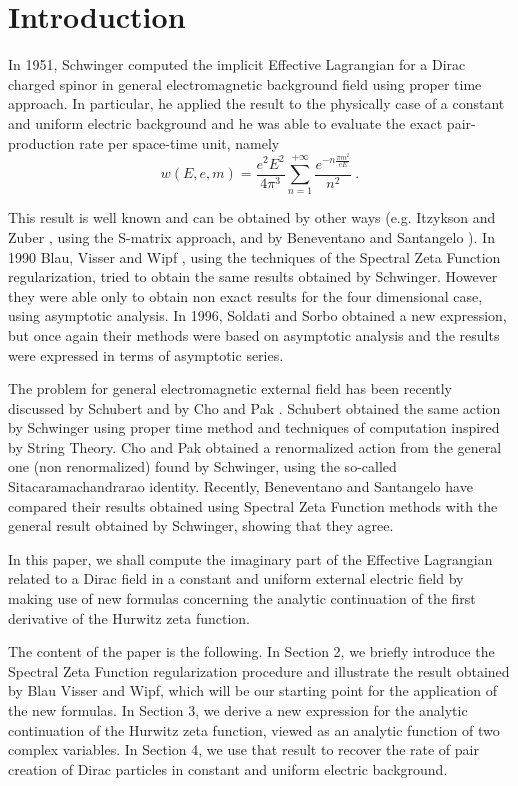 \documentclass [11pt]{article}
\begin{document}
\section{Introduction}

In 1951, Schwinger \cite{Schwinger:1951nm} computed the implicit Effective Lagrangian for a Dirac charged
spinor in general electromagnetic background field using proper time approach.
 In particular, he applied the result to the physically  case of a constant 
and uniform
 electric background and he was able to evaluate 
the exact pair-production rate per space-time unit, namely
\begin{equation}
\label{schw}
w(E,e,m)=\frac{e^{2}E^{2}}{4\pi ^{3}}\sum _{n=1}^{+\infty }\frac{e^{-n\frac{\pi m^{2}}{eE}}}{n^{2}}\:.
\end{equation}

This result is well known and can be obtained by other ways (e.g. Itzykson and
Zuber \cite{2}, using the S-matrix approach, and by Beneventano and Santangelo \cite{3}). In 1990 Blau, Visser and Wipf
\cite{Blau:1991iz}, using the techniques of
the Spectral Zeta Function regularization, tried to obtain the same results 
obtained by
Schwinger. However they were able  
only to obtain non exact results for the four dimensional case,
 using asymptotic analysis. In 1996, Soldati and Sorbo \cite{Soldati:1998vq} obtained a new expression,
but once again their methods were based on asymptotic analysis and the results were expressed in terms of
asymptotic series.

The problem for general electromagnetic external field 
has been recently discussed  by Schubert \cite{Schubert:2000yt} and by 
Cho and Pak \cite{Cho:2001ei}. Schubert obtained the same action by Schwinger  using proper time method and techniques of 
computation inspired by String Theory. Cho and Pak  obtained a 
renormalized action from the general one (non renormalized) 
found by Schwinger, using the so-called  Sitacaramachandrarao identity.
Recently, Beneventano and Santangelo \cite{5} have compared their results 
obtained using Spectral Zeta Function methods  with the 
general result obtained by Schwinger, showing that they agree.

In this paper, we shall compute the imaginary part of the Effective Lagrangian 
related to a Dirac field in a constant and uniform external electric field by
making use of new formulas concerning the analytic continuation of the 
first derivative of the  Hurwitz zeta function.

The content of the paper is the following. In   Section 2, we  briefly 
introduce the Spectral Zeta Function regularization procedure and illustrate 
the result obtained by Blau Visser and Wipf, which will be our 
starting point for the application of the new formulas. In  Section 3,
  we derive a new expression for the analytic continuation of the Hurwitz 
zeta function,
viewed as an analytic function of two complex variables. In Section 4, we
use that result to recover the rate of pair creation of Dirac particles in 
constant and uniform electric
background.
\end{document}

